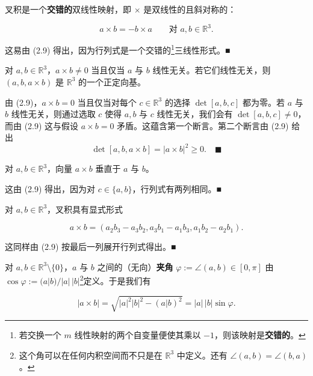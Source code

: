 \begin{remark}

\begin{items}
\item

叉积是一个\textbf{交错的}双线性映射，即 $ \times $ 是双线性的且斜对称的：

\[
a \times b = -b \times a \qquad \text{对 } a, b \in \mathbb{R}^{3} .
\]

\proofhead
这易由 (2.9) 得出，因为行列式是一个交错的\footnote{若交换一个 $ m $ 线性映射的两个自变量便使其乘以 $ -1 $，则该映射是\textbf{交错的}。}三线性形式。\nobreak\hspace{0.35em}■
\item

对 $ a, b \in \mathbb{R}^{3} $，$ a \times b \ne 0 $ 当且仅当 $ a $ 与 $ b $ 线性无关。若它们线性无关，则 $ (a, b, a \times b) $ 是 $ \mathbb{R}^{3} $ 的一个正定向基。

\proofhead
由 (2.9)，$ a \times b = 0 $ 当且仅当对每个 $ c \in \mathbb{R}^{3} $ 的选择 $ \det[a, b, c] $ 都为零。若 $ a $ 与 $ b $ 线性无关，则通过选取 $ c $ 使得 $ a, b $ 与 $ c $ 线性无关，我们会有 $ \det[a, b, c] \ne 0 $，而由 (2.9) 这与假设 $ a \times b = 0 $ 矛盾。这蕴含第一个断言。第二个断言由 (2.9) 给出
\[
\det[a, b, a \times b] = |a \times b|^{2} \ge 0 .\quad\blacksquare
\]
\item

对 $ a, b \in \mathbb{R}^{3} $，向量 $ a \times b $ 垂直于 $ a $ 与 $ b $。

\proofhead
这由 (2.9) 得出，因为对 $ c \in \{a, b\} $，行列式有两列相同。\nobreak\hspace{0.35em}■
\item

对 $ a, b \in \mathbb{R}^{3} $，叉积具有显式形式

\[
a \times b = (a_{2}b_{3} - a_{3}b_{2}, a_{3}b_{1} - a_{1}b_{3}, a_{1}b_{2} - a_{2}b_{1}) .
\]

\proofhead
这同样由 (2.9) 按最后一列展开行列式得出。\nobreak\hspace{0.35em}■
\item

对 $ a, b \in \mathbb{R}^{3}\setminus\{0\} $，$ a $ 与 $ b $ 之间的（无向）\textbf{夹角} $ \varphi := \angle(a, b) \in [0, \pi] $ 由 $ \cos\varphi := (a|b)/|a|\,|b| $\footnote{这个角可以在任何内积空间而不只是在 $ \mathbb{R}^{3} $ 中定义。还有 $ \angle(a, b) = \angle(b, a) $。}定义。于是我们有

\[
|a \times b| = \sqrt{|a|^{2}|b|^{2} - (a|b)^{2}} = |a|\,|b|\sin\varphi .
\]


\end{items}
\end{remark}
